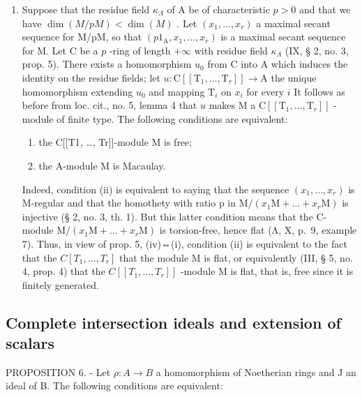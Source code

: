 \begin{enumerate}
\item
  Suppose that the residue field \(\kappa_{\Lambda}\) of A be of characteristic \(p > 0\) and that we have \(\dim(M/pM) < \dim(M)\) . Let \((x_1, \ldots, x_r)\) a maximal secant sequence for M/pM, so that \((p1_{\mathrm{A}}, x_1, \ldots, x_r)\) is a maximal secant sequence for M. Let C be a \(p\) -ring of length \(+\infty\) with residue field \(\kappa_{\Lambda}\) (IX, § 2, no. 3, prop. 5). There exists a homomorphism \(u_0\) from C into A which induces the identity on the residue fields; let \(u: \mathrm{C}[[\mathrm{T}_1, \ldots, \mathrm{T}_r]] \longrightarrow \mathrm{A}\) the unique homomorphism extending \(u_0\) and mapping \(\mathrm{T}_i\) on \(x_i\) for every \(i\) It follows as before from loc. cit., no. 5, lemma 4 that \(u\) makes M a \(\mathrm{C}[[\mathrm{T}_1, \ldots, \mathrm{T}_r]]\) -module of finite type. The following conditions are equivalent:
  \begin{enumerate}
  \def\labelenumii{(\roman{enumii})}
\item
  the C{[}{[}T1, \ldots, Tr{]}{]}-module M is free;
\item
  the A-module M is Macaulay.
\end{enumerate}

Indeed, condition (ii) is equivalent to saying that the sequence \((x_{1},\ldots,x_{r})\) is M-regular and that the homothety with ratio p in \(\mathrm{M}/(x_{1}\mathrm{M}+\ldots+x_{r}\mathrm{M})\) is injective (§ 2, no. 3, th. 1). But this latter condition means that the C-module \(\mathrm{M}/(x_{1}\mathrm{M}+\ldots+x_{r}\mathrm{M})\) is torsion-free, hence flat (Λ, X, p.~9, example 7). Thus, in view of prop. 5, (iv)⇔(i), condition (ii) is equivalent to the fact that the \(C[T_{1},\ldots,T_{r}]\) that the module M is flat, or equivalently (III, § 5, no. 4, prop. 4) that the \(C[[T_{1},\ldots,T_{r}]]\) -module M is flat, that is, free since it is finitely generated.

\end{enumerate}

\subsection{Complete intersection ideals and extension of scalars}

PROPOSITION 6. - Let \(\rho: A \to B\) a homomorphism of Noetherian rings and J an ideal of B. The following conditions are equivalent:

